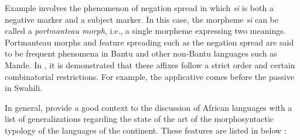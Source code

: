 \documentclass[output=paper,hidelinks]{langscibook}
\begin{document}
Example  involves the phenomenon of negation spread in which \textit{si} is both a negative marker and a subject marker. In this case, the morpheme \textit{si} can be called a \textit{portmanteau morph}, i.e., a single morpheme expressing two meanings. Portmanteau morphs and feature spreading such as the negation spread are said to be frequent phenomena in Bantu and other non-Bantu languages such as Mande. In , it is demonstrated that these affixes follow a strict order and certain combinatorial restrictions. For example, the applicative comes before the passive in Swahili.

In general, \citet{CreisselsGood2018} provide a good context to the discussion of African languages with a list of generalizations regarding the state of the art of the morphosyntactic typology of the languages of the continent. These features are listed in  below \citep[709--710]{CreisselsGood2018}:
\end{document}
